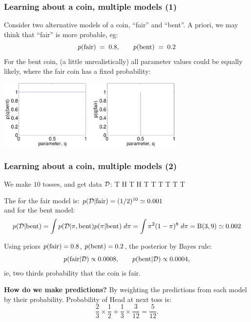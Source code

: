 \begin{frame}
\frametitle{Learning about a coin, multiple models (1)}

Consider two alternative models of a coin, ``fair'' and ``bent''. A
priori, we may think that ``fair'' is more probable, eg:
%
\[
p({\rm fair})\;=\;0.8,\qquad p({\rm bent})\;=\;0.2
\]
For the bent coin, (a little unrealistically) all parameter values
could be equally likely, where the fair coin has a fixed probability: \\[2ex]

\centerline{\includegraphics[width=0.7\textwidth]{Beta11andBetaInfInf}}

\end{frame}


\begin{frame}
\frametitle{Learning about a coin, multiple models (2)}

We make $10$ tosses, and get data ${\cal D}$: T H T H T T T T T T

The  for the fair model is: $
p({\cal D}|{\rm fair}) = (1/2)^{10}\simeq 0.001
$\\
and for the bent  model:
\begin{equation*}
p({\cal D}|{\rm bent}) = \int p({\cal D}|\pi,{\rm bent})p(\pi|{\rm
  bent})  \; d\pi =  \int  \pi^2(1-\pi)^8 \; d\pi={\rm B}(3,9)\simeq 0.002
\end{equation*}

Using priors $p({\rm fair})=0.8$, $p({\rm bent})=0.2$, the posterior by Bayes rule:
\[
p({\rm fair}|{\cal D}) \propto 0.0008,\qquad p({\rm bent}|{\cal D}) \propto
0.0004,
\]
ie, two thirds probability that the coin is fair.

{\bf How do we make predictions?} By weighting the predictions from each
model by their probability. Probability of Head at next toss is:
\[
\frac{2}{3}\times \frac{1}{2} + \frac{1}{3}\times \frac{3}{12} = \frac{5}{12}.
\]
\end{frame}

